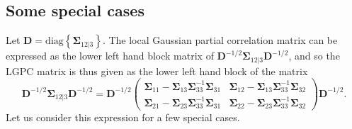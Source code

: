 \documentclass[
  12pt,
  letterpaper]{article}
\numberwithin{equation}{section}
\newcommand{\D}{\bm{D}}
\newcommand{\fSigma}{\bm{\Sigma}}
\begin{document}
\hypertarget{special-cases}{%
\subsection{Some special cases}\label{special-cases}}

Let \(\D = \textrm{diag}\left\{\fSigma_{12|3}\right\}\). The local Gaussian partial correlation matrix can be expressed as the lower left hand block matrix of \(\D^{-1/2}\fSigma_{12|3}\D^{-1/2}\), and so the LGPC matrix is thus given as the lower left hand block of the matrix
\begin{equation}
\D^{-1/2}\fSigma_{12|3}\D^{-1/2} = \D^{-1/2}\begin{pmatrix} \fSigma_{11} - \fSigma_{13}\fSigma_{33}^{-1} \fSigma_{31} & \fSigma_{12} - \fSigma_{13}\fSigma_{33}^{-1} \fSigma_{32} \\ \fSigma_{21} - \fSigma_{23}\fSigma_{33}^{-1} \fSigma_{31} & \fSigma_{22} - \fSigma_{23}\fSigma_{33}^{-1} \fSigma_{32}\end{pmatrix}\D^{-1/2}.
\label{eq:matrixdef}
\end{equation}
Let us consider this expression for a few special cases.
\end{document}
